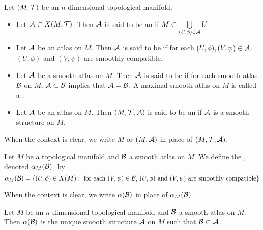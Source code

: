 \documentclass{book}
\begin{document}
	\begin{defn} 
		Let $(M, \mathcal{T})$ be an $n$-dimensional topological manifold.
		\begin{itemize}
			\item Let $\mathcal{A} \subset X(M, \mathcal{T})$. Then $\mathcal{A}$ is said to be an  if  $M \subset \bigcup\limits_{(U,\phi) \in \mathcal{A}} U$.
			\item Let $\mathcal{A}$ be an atlas on $M$. Then $\mathcal{A}$ is said to be  if for each $(U, \phi), (V, \psi) \in \mathcal{A}$, $(U,\phi)$ and $(V,\psi)$ are smoothly compatible.
			\item Let $\mathcal{A}$ be a smooth atlas on $M$. Then $\mathcal{A}$ is said to be  if for each smooth atlas $\mathcal{B}$ on $M$, $\mathcal{A} \subset \mathcal{B}$ implies that $\mathcal{A} = \mathcal{B}$. A maximal smooth atlas on $M$ is called a .
			\item Let $\mathcal{A}$ be an atlas on $M$. Then $(M, \mathcal{T}, \mathcal{A})$ is said to be an  if $\mathcal{A}$ is a smooth structure on $M$. 
		\end{itemize}
	\end{defn}

	\begin{note}
		When the context is clear, we write $M$ or $(M, \mathcal{A})$ in place of $(M, \mathcal{T}, \mathcal{A})$.
	\end{note}

	\begin{defn} 
		Let $M$ be a topological manifold and $\mathcal{B}$ a smooth atlas on $M$. We define the , denoted $\alpha_M(\mathcal{B})$, by 
		$$\alpha_M(\mathcal{B}) = \{(U, \phi) \in X(M): \text{ for each $(V, \psi) \in \mathcal{B}$,  $(U, \phi)$ and $(V, \psi) $ are smoothly compatible}\}$$
	\end{defn}

	\begin{note}
		When the context is clear, we write $\alpha(\mathcal{B})$ in place of $\alpha_M(\mathcal{B})$.
	\end{note}

	\begin{ex} 
		Let $M$ be an $n$-dimensional topological manifold and $\mathcal{B}$ a smooth atlas on $M$. Then $\alpha(\mathcal{B})$ is the unique smooth structure $\mathcal{A}$ on $M$ such that $\mathcal{B} \subset \mathcal{A}$.
	\end{ex}
\end{document}
